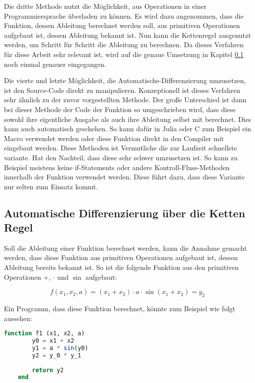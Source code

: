 Die dritte Methode nutzt die Möglichkeit, aus Operationen 
in einer Programmiersprache überladen zu können.
Es wird dazu angenommen, dass die Funktion, dessen Ableitung berechnet werden soll, aus primitiven Operationen aufgebaut ist, dessen Ableitung bekannt ist.
Nun kann die Kettenregel ausgenutzt werden, um Schritt für Schritt die Ableitung zu berechnen.
Da dieses Verfahren für diese Arbeit sehr relevant ist, wird auf die genaue Umsetzung in Kapitel \ref{sec:ketten_regel} noch einmal genauer eingegangen.

Die vierte und letzte Möglichkeit, die Automatische-Differenzierung umzusetzen, ist den Source-Code direkt zu manipulieren.
Konzeptionell ist dieses Verfahren sehr ähnlich zu der zuvor vorgestellten Methode. 
Der große Unterschied ist dann bei dieser Methode der Code der Funktion so umgeschrieben wird, 
dass diese sowohl ihre eigentliche Ausgabe als auch ihre Ableitung selbst mit berechnet.
Dies kann auch automatisch geschehen.
So kann dafür in Julia oder C zum Beispiel ein Macro verwendet werden oder diese Funktion direkt in den Compiler mit eingebaut werden.
Diese Methoden ist Vermutliche die zur Laufzeit schnellste variante.
Hat den Nachteil, dass diese sehr schwer umzusetzen ist.
So kann zu Beispiel meistens keine if-Statements oder andere Kontroll-Fluss-Methoden innerhalb der Funktion verwendet werden. 
Diese führt dazu, dass diese Variante nur selten zum Einsatz kommt.

\subsection{Automatische Differenzierung über die Ketten Regel} \label{sec:ketten_regel}

Soll die Ableitung einer Funktion berechnet werden, 
kann die Annahme gemacht werden, 
dass diese Funktion aus primitiven Operationen aufgebaut ist, dessen Ableitung bereits bekannt ist.
So ist die folgende Funktion aus den primitiven Operationen $+$, $\cdot$ und $\sin$ aufgebaut:

$$
f(x_1, x_2, a) = (x_1 + x_2) \cdot a \cdot \sin(x_1 + x_2) = y_2
$$

Ein Programm, dass diese Funktion berechnet, könnte zum Beispiel wie folgt aussehen:

\begin{lstlisting}[language=Julia]
    function f1 (x1, x2, a)
        y0 = x1 + x2
        y1 = a * sin(y0)
        y2 = y_0 * y_1
        
    	return y2
    end
\end{lstlisting}

